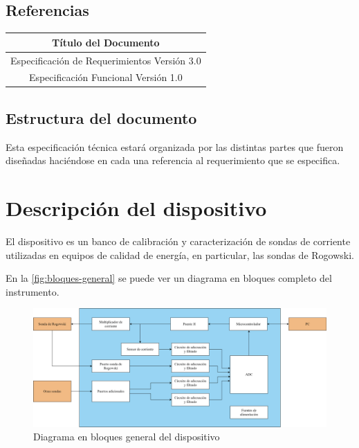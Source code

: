 \documentclass[titlepage, 12pt]{article}
\begin{document}
  \subsection{Referencias}
  \begin{table}[H]
    \centering
    \begin{tabular}{|c|}
      \hline
      \rowcolor[HTML]{C0C0C0}
      Título del Documento                           \\ \hline
      Especificación de Requerimientos Versión 3.0   \\ \hline
      Especificación Funcional Versión 1.0           \\ \hline %
    \end{tabular}
  \end{table}

  \subsection{Estructura del documento}
  Esta especificación técnica estará organizada por las distintas partes que fueron diseñadas haciéndose en cada una referencia al requerimiento que se especifica.


\section{Descripción del dispositivo}
El dispositivo es un banco de calibración y caracterización de sondas de corriente utilizadas en equipos de calidad de energía, en particular, las sondas de Rogowski.

En la \autoref{fig:bloques-general} se puede ver un diagrama en bloques completo del instrumento.

  \begin{figure}[!htbp]
    \centering
    \includegraphics[width=\textwidth]{diagrams/bloques-general.png}
    \caption{Diagrama en bloques general del dispositivo}
    \label{fig:bloques-general}
  \end{figure}
\end{document}
